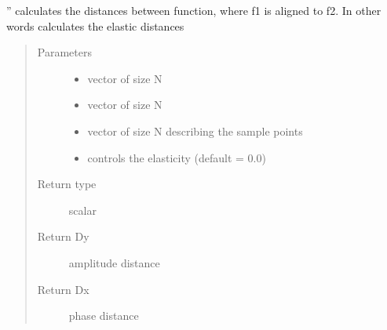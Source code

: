 \documentclass[letterpaper,10pt,english]{sphinxmanual}
\begin{document}
\begin{fulllineitems}
\label{\detokenize{utility_functions:utility_functions.elastic_distance}}
”
calculates the distances between function, where f1 is aligned to
f2. In other words
calculates the elastic distances
\begin{quote}\begin{description}
\item[{Parameters}] \leavevmode\begin{itemize}
\item {} 
 \textendash{} vector of size N

\item {} 
 \textendash{} vector of size N

\item {} 
 \textendash{} vector of size N describing the sample points

\item {} 
 \textendash{} controls the elasticity (default = 0.0)

\end{itemize}

\item[{Return type}] \leavevmode
scalar

\item[{Return Dy}] \leavevmode
amplitude distance

\item[{Return Dx}] \leavevmode
phase distance

\end{description}\end{quote}

\end{fulllineitems}

\end{document}
